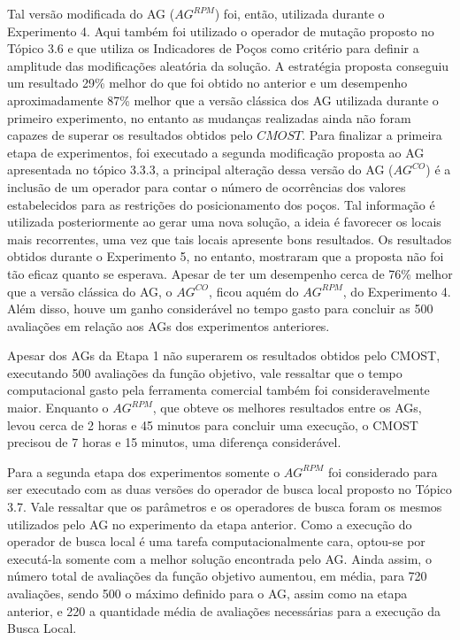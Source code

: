 Tal versão modificada do AG ($AG^{RPM}$) foi, então, utilizada durante o Experimento 4. Aqui também foi utilizado o operador de mutação proposto no Tópico 3.6 e que utiliza os Indicadores de Poços como critério para definir a amplitude das modificações aleatória da solução. A estratégia proposta conseguiu um resultado 29\% melhor do que foi obtido no anterior e um desempenho aproximadamente 87\% melhor que a versão clássica dos AG utilizada durante o primeiro experimento, no entanto as mudanças realizadas ainda não foram capazes de superar os resultados obtidos pelo $CMOST$. Para finalizar a primeira etapa de experimentos, foi executado a segunda modificação proposta ao AG apresentada no tópico 3.3.3, a principal alteração dessa versão do AG ($AG^{CO}$) é a inclusão de um operador para contar o número de ocorrências dos valores estabelecidos para as restrições do posicionamento dos poços. Tal informação é utilizada posteriormente ao gerar uma nova solução, a ideia é favorecer os locais mais recorrentes, uma vez que tais locais apresente bons resultados. Os resultados obtidos durante o Experimento 5, no entanto, mostraram que a proposta não foi tão eficaz quanto se esperava. Apesar de ter um desempenho cerca de 76\% melhor que a versão clássica do AG, o $AG^{CO}$, ficou aquém do $AG^{RPM}$, do Experimento 4. Além disso, houve um ganho considerável no tempo gasto para concluir as 500 avaliações em relação aos AGs dos experimentos anteriores.

Apesar dos AGs da Etapa 1 não superarem os resultados obtidos pelo CMOST, executando 500 avaliações da função objetivo, vale ressaltar que o tempo computacional gasto pela ferramenta comercial também foi consideravelmente maior. Enquanto o $AG^{RPM}$, que obteve os melhores resultados entre os AGs, levou cerca de 2 horas e 45 minutos para concluir uma execução, o CMOST precisou de 7 horas e 15 minutos, uma diferença considerável.

Para a segunda etapa dos experimentos somente o $AG^{RPM}$ foi considerado para ser executado com as duas versões do operador de busca local proposto no Tópico 3.7. Vale ressaltar que os parâmetros e os operadores de busca foram os mesmos utilizados pelo AG no experimento da etapa anterior. Como a execução do operador de busca local é uma tarefa computacionalmente cara, optou-se por executá-la somente com a melhor solução encontrada pelo AG. Ainda assim, o número total de avaliações da função objetivo aumentou, em média, para 720 avaliações, sendo 500 o máximo definido para o AG, assim como na etapa anterior, e 220 a quantidade média de avaliações necessárias para a execução da Busca Local.

